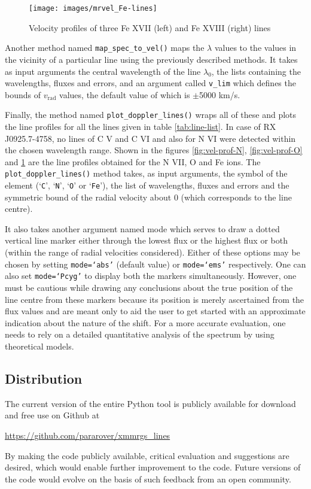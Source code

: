 			    \begin{figure}[!htb]
    				\centering
    				\texttt{[image: images/mrvel\_Fe-lines]}
    				\caption{Velocity profiles of three Fe XVII (left) and Fe XVIII (right) lines}
    				\label{fig:vel-prof-Fe}
			    \end{figure}
                
                Another method named \texttt{map\_spec\_to\_vel()} maps the $\lambda$ values to the  values in the vicinity of a particular line using the previously described methods. It takes as input arguments the central wavelength of the line $\lambda_0$, the lists containing the wavelengths, fluxes and errors, and an argument called \texttt{v\_lim} which defines the bounds of $v_\text{rad}$ values, the default value of which is $\pm$5000 km/s.
                
                Finally, the method named \texttt{plot\_doppler\_lines()} wraps all of these and plots the line profiles for all the lines given in table \ref{tab:line-list}. In case of RX J0925.7-4758, no lines of C V and C VI and also for N VI were detected within the chosen wavelength range. Shown in the figures \ref{fig:vel-prof-N}, \ref{fig:vel-prof-O} and \ref{fig:vel-prof-Fe} are the line profiles obtained for the N VII, O and Fe ions. The \texttt{plot\_doppler\_lines()} method takes, as input arguments, the symbol of the element (`\texttt{C}', `\texttt{N}', `\texttt{O}' or `\texttt{Fe}'), the list of wavelengths, fluxes and errors and the symmetric bound of the radial velocity about 0 (which corresponds to the line centre).
                
                It also takes another argument named mode which serves to draw a dotted vertical line marker either through the lowest flux or the highest flux or both (within the range of radial velocities considered). Either of these options may be chosen by setting \texttt{mode=`abs'} (default value) or \texttt{mode=`ems'} respectively. One can also set \texttt{mode=`Pcyg'} to display both the markers simultaneously. However, one must be cautious while drawing any conclusions about the true position of the line centre from these markers because its position is merely ascertained from the flux values and are meant only to aid the user to get started with an approximate indication about the nature of the shift. For a more accurate evaluation, one needs to rely on a detailed quantitative analysis of the spectrum by using theoretical models.
                
    \subsection{Distribution} \label{tool:rgs-files:distribution}
    	The current version of the entire Python tool is publicly available for download and free use on Github at
    	\begin{center}
    		\url{https://github.com/pararover/xmmrgs_lines}
    	\end{center}
    	By making the code publicly available, critical evaluation and suggestions are desired, which would enable further improvement to the code. Future versions of the code would evolve on the basis of such feedback from an open community.
    	
